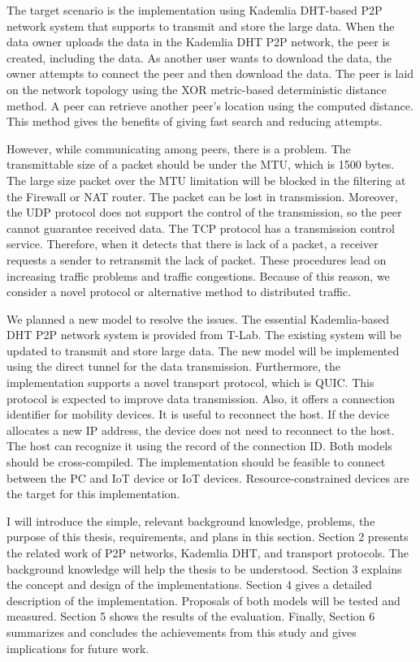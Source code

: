 The target scenario is the implementation using Kademlia DHT-based P2P network system \cite{maymounkov2002kademlia} that supports to transmit and store the large data. When the data owner uploads the data in the Kademlia DHT P2P network, the peer is created, including the data. As another user wants to download the data, the owner attempts to connect the peer and then download the data. The peer is laid on the network topology using the XOR metric-based deterministic distance method. A peer can retrieve another peer’s location using the computed distance. This method gives the benefits of giving fast search and reducing attempts. 

However, while communicating among peers, there is a problem. The transmittable size of a packet should be under the MTU, which is 1500 bytes. The large size packet over the MTU limitation will be blocked in the filtering at the Firewall or NAT router. The packet can be lost in transmission. Moreover, the UDP protocol does not support the control of the transmission, so the peer cannot guarantee received data. The TCP protocol has a transmission control service. Therefore, when it detects that there is lack of a packet, a receiver requests a sender to retransmit the lack of packet. These procedures lead on increasing traffic problems and traffic congestions. Because of this reason, we consider a novel protocol or alternative method to distributed traffic. 

We planned a new model to resolve the issues. The essential Kademlia-based DHT P2P network system is provided from T-Lab. The existing system will be updated to transmit and store large data. The new model will be implemented using the direct tunnel for the data transmission. Furthermore, the implementation supports a novel transport protocol, which is QUIC. This protocol is expected to improve data transmission. Also, it offers a connection identifier for mobility devices. It is useful to reconnect the host. If the device allocates a new IP address, the device does not need to reconnect to the host. The host can recognize it using the record of the connection ID. Both models should be cross-compiled. The implementation should be feasible to connect between the PC and IoT device or IoT devices. Resource-constrained devices are the target for this implementation.

I will introduce the simple, relevant background knowledge, problems, the purpose of this thesis, requirements, and plans in this section. Section 2 presents the related work of P2P networks, Kademlia DHT, and transport protocols. The background knowledge will help the thesis to be understood. Section 3 explains the concept and design of the implementations. Section 4 gives a detailed description of the implementation. Proposals of both models will be tested and measured. Section 5 shows the results of the evaluation. Finally, Section 6 summarizes and concludes the achievements from this study and gives implications for future work.
